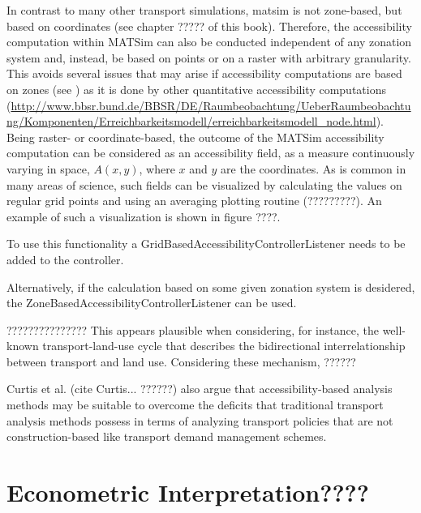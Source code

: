 In contrast to many other transport simulations, \gls{matsim} is not zone-based, but based on coordinates (see 
chapter ????? of this book). Therefore, the accessibility computation within MATSim can also be conducted independent 
of any zonation system and, instead, be based on points or on a raster with arbitrary granularity. This avoids 
several issues that may arise if accessibility computations are based on zones 
(see \citep[e.g.,][]{NicolaiNagel2012HiResAccessibilityMethodInBook}) as it is done by other quantitative 
accessibility computations 
%
%
(\url{http://www.bbsr.bund.de/BBSR/DE/Raumbeobachtung/UeberRaumbeobachtung/Komponenten/Erreichbarkeitsmodell/erreichbarkeitsmodell_node.html}). Being raster- or coordinate-based, the outcome of the MATSim accessibility computation can be considered as 
an accessibility field,
\ie as a measure continuously varying in space, $A(x,y)$, where $x$ and $y$
are the coordinates. As is common in many areas of science, such
fields can be visualized by calculating the values on regular grid
points and using an averaging plotting routine (?????????). An example of such a visualization is shown in figure ????.

To use this functionality a GridBasedAccessibilityControllerListener needs to be added to the controller.

Alternatively, if the calculation based on some given zonation system is desidered, the ZoneBasedAccessibilityControllerListener can be used.





???????????????
This appears plausible when considering, for instance, the well-known transport-land-use cycle that describes the 
bidirectional interrelationship between transport and land use. Considering these mechanism, ?????? 

Curtis et al. (cite Curtis... ??????) also argue that accessibility-based analysis methods may be suitable to overcome 
the deficits that traditional transport analysis methods possess in terms of analyzing transport policies that are not 
construction-based like transport demand management schemes.





\section{Econometric Interpretation????}

